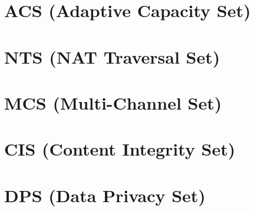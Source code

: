 \section{ACS (Adaptive Capacity Set)}


\section{NTS (NAT Traversal Set)}


\section{MCS (Multi-Channel Set)}


\section{CIS (Content Integrity Set)}


\section{DPS (Data Privacy Set)}


\begin{comment}

\end{comment}


